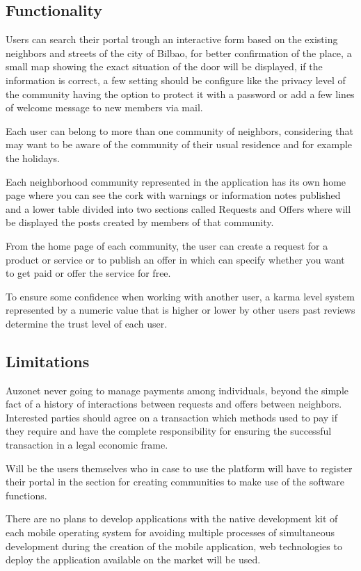 \documentclass{DeustoFDP}
\begin{document}
\subsection{Functionality}
Users can search their portal trough an interactive form based on the existing neighbors and streets of the city of Bilbao, for better confirmation of the place, a small map showing the exact situation of the door will be displayed, if the information is correct, a few setting should be configure like the privacy level of the community having the option to protect it with a password or add a few lines of welcome message to new members via mail.

Each user can belong to more than one community of neighbors, considering that may want to be aware of the community of their usual residence and for example the holidays.

Each neighborhood community represented in the application has its own home page where you can see the cork with warnings or information notes published and a lower table divided into two sections called Requests and Offers where will be displayed the posts created by members of that community.

From the home page of each community, the user can create a request for a product or service or to publish an offer in which can specify whether you want to get paid or offer the service for free.

To ensure some confidence when working with another user, a karma level system represented by a numeric value that is higher or lower by other users past reviews determine the trust level of each user.

\subsection{Limitations}
Auzonet never going to manage payments among individuals, beyond the simple fact of a history of interactions between requests and offers between neighbors. Interested parties should agree on a transaction which methods used to pay if they require and have the complete responsibility for ensuring the successful transaction in a legal economic frame.

Will be the users themselves who in case to use the platform will have to register their portal in the section for creating communities to make use of the software functions.

There are no plans to develop applications with the native development kit of each mobile operating system for avoiding multiple processes of simultaneous development during the creation of the mobile application, web technologies to deploy the application available on the market will be used.
\end{document}
